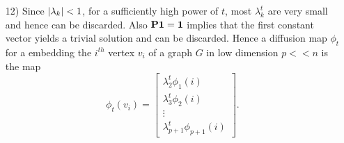 \begin{itemize}
\item [12)] Since $\lvert\lambda_{k}\rvert < 1$, for a sufficiently high power of $t$,
most $\lambda_{k}^{t}$ are very small and hence can be discarded.
Also $\textbf{P}\boldsymbol{1} = \boldsymbol{1}$ implies that the first constant vector
yields a trivial solution and can be discarded.
Hence a diffusion map $\phi_{t}$ for a embedding the $i^{th}$ vertex $v_{i}$ of a graph $G$ in  low dimension $p << n$ is the map 
$$\phi_{t}(v_{i}) = \begin{bmatrix}
         \lambda_{2}^{t}\phi_{1}(i)\\
         \lambda_{3}^{t}\phi_{2}(i)\\
         \vdots\\
         \lambda_{p+1}^{t}\phi_{p+1}(i)
        \end{bmatrix} .$$
        
        

\end{itemize}
%
%
%








